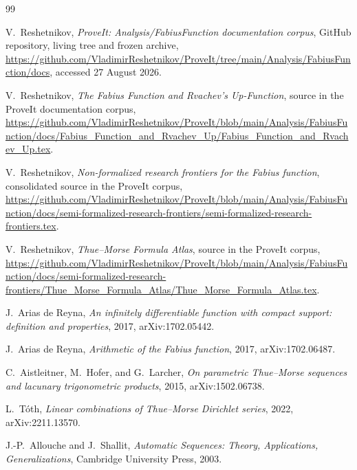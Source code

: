 \documentclass[11pt]{article}
\numberwithin{equation}{section}
\theoremstyle{definition}
\theoremstyle{remark}
\begin{document}
\begin{thebibliography}{99}

V.~Reshetnikov,
\emph{ProveIt: Analysis/FabiusFunction documentation corpus},
GitHub repository, living tree and frozen archive,
\url{https://github.com/VladimirReshetnikov/ProveIt/tree/main/Analysis/FabiusFunction/docs},
accessed 27 August 2026.

V.~Reshetnikov,
\emph{The Fabius Function and Rvachev's Up-Function},
source in the ProveIt documentation corpus,
\url{https://github.com/VladimirReshetnikov/ProveIt/blob/main/Analysis/FabiusFunction/docs/Fabius_Function_and_Rvachev_Up/Fabius_Function_and_Rvachev_Up.tex}.

V.~Reshetnikov,
\emph{Non-formalized research frontiers for the Fabius function},
consolidated source in the ProveIt corpus,
\url{https://github.com/VladimirReshetnikov/ProveIt/blob/main/Analysis/FabiusFunction/docs/semi-formalized-research-frontiers/semi-formalized-research-frontiers.tex}.

V.~Reshetnikov,
\emph{Thue--Morse Formula Atlas},
source in the ProveIt corpus,
\url{https://github.com/VladimirReshetnikov/ProveIt/blob/main/Analysis/FabiusFunction/docs/semi-formalized-research-frontiers/Thue_Morse_Formula_Atlas/Thue_Morse_Formula_Atlas.tex}.

J.~Arias de Reyna,
\emph{An infinitely differentiable function with compact support: definition and properties},
2017, arXiv:1702.05442.

J.~Arias de Reyna,
\emph{Arithmetic of the Fabius function},
2017, arXiv:1702.06487.

C.~Aistleitner, M.~Hofer, and G.~Larcher,
\emph{On parametric Thue--Morse sequences and lacunary trigonometric products},
2015, arXiv:1502.06738.

L.~T\'oth,
\emph{Linear combinations of Thue--Morse Dirichlet series},
2022, arXiv:2211.13570.

J.-P.~Allouche and J.~Shallit,
\emph{Automatic Sequences: Theory, Applications, Generalizations},
Cambridge University Press, 2003.

\end{thebibliography}
\end{document}
